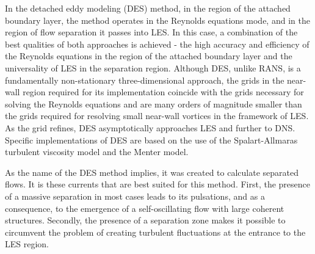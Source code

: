 	In the detached eddy modeling (DES) method, in the region of the attached boundary layer, the method operates in the Reynolds equations mode, and in the region of flow separation it passes into LES. In this case, a combination of the best qualities of both approaches is achieved - the high accuracy and efficiency of the Reynolds equations in the region of the attached boundary layer and the universality of LES in the separation region. Although DES, unlike RANS, is a fundamentally non-stationary three-dimensional approach, the grids in the near-wall region required for its implementation coincide with the grids necessary for solving the Reynolds equations and are many orders of magnitude smaller than the grids required for resolving small near-wall vortices in the framework of LES. As the grid refines, DES asymptotically approaches LES and further to DNS. Specific implementations of DES are based on the use of the Spalart-Allmaras turbulent viscosity model and the Menter model\cite{Strelets2001}.
	
	As the name of the DES method implies, it was created to calculate separated flows. It is these currents that are best suited for this method. First, the presence of a massive separation in most cases leads to its pulsations, and as a consequence, to the emergence of a self-oscillating flow with large coherent structures. Secondly, the presence of a separation zone makes it possible to circumvent the problem of creating turbulent fluctuations at the entrance to the LES region.
	
